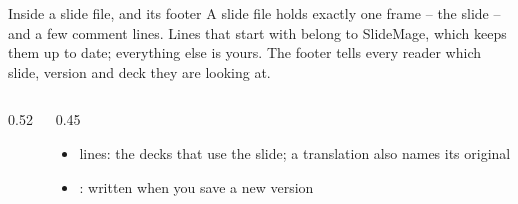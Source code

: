 
\begin{standardframe}{Inside a slide file, and its footer}
	\small
	A slide file holds exactly one frame -- the slide -- and a few comment lines.
	Lines that start with \SMCode{\%\%} belong to SlideMage, which keeps them up
	to date; everything else is yours. The footer tells every reader which slide,
	version and deck they are looking at.
	\par
	\begin{columns}[T,onlytextwidth]
		\begin{column}{0.52\linewidth}
		\end{column}
		\begin{column}{0.45\linewidth}
			\begin{itemize}
				\item \SMCode{\%\%} lines: the decks that use the slide; a translation also names its original
				\item {}: written when you save a new version
			\end{itemize}
		\end{column}
	\end{columns}
	\edef{}%
	\edef\nttext{\the\wd0}%
	\edef\ntnav{\the\wd0}%
	\edef\ntnum{\the\wd0}%
	\edef\ntgap{\the\wd0}%
	\edef\ntid{\the\wd0}%
	\edef\ntsep{\the\wd0}%
	\edef\ntver{\the\wd0}%

\end{standardframe}

